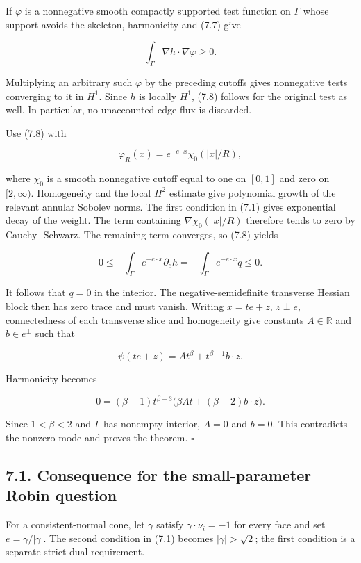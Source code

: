 \documentclass[11pt]{article}
\begin{document}
If \(\varphi\) is a nonnegative smooth compactly supported test function
on \(\overline\Gamma\) whose support avoids the skeleton, harmonicity
and (7.7) give

\[
\int_\Gamma\nabla h\cdot\nabla\varphi\ge0.
\tag{7.8}
\]

Multiplying an arbitrary such \(\varphi\) by the preceding cutoffs gives
nonnegative tests converging to it in \(H^1\). Since \(h\) is locally
\(H^1\), (7.8) follows for the original test as well. In particular, no
unaccounted edge flux is discarded.

Use (7.8) with

\[
\varphi_R(x)=e^{-e\cdot x}\chi_0(|x|/R),
\tag{7.9}
\]

where \(\chi_0\) is a smooth nonnegative cutoff equal to one on
\([0,1]\) and zero on \([2,\infty)\). Homogeneity and the local \(H^2\)
estimate give polynomial growth of the relevant annular Sobolev norms.
The first condition in (7.1) gives exponential decay of the weight. The
term containing \(\nabla\chi_0(|x|/R)\) therefore tends to zero by
Cauchy-\/-Schwarz. The remaining term converges, so (7.8) yields

\[
0\le-\int_\Gamma e^{-e\cdot x}\partial_e h
=-\int_\Gamma e^{-e\cdot x}q\le0.
\tag{7.10}
\]

It follows that \(q=0\) in the interior. The negative-semidefinite
transverse Hessian block then has zero trace and must vanish. Writing
\(x=te+z\), \(z\perp e\), connectedness of each transverse slice and
homogeneity give constants \(A\in\mathbb R\) and \(b\in e^\perp\) such
that

\[
\psi(te+z)=At^\beta+t^{\beta-1}b\cdot z.
\tag{7.11}
\]

Harmonicity becomes

\[
0=(\beta-1)t^{\beta-3}
\big(\beta At+(\beta-2)b\cdot z\big).
\tag{7.12}
\]

Since \(1<\beta<2\) and \(\Gamma\) has nonempty interior, \(A=0\) and
\(b=0\). This contradicts the nonzero mode and proves the theorem. \(\square\)

\subsection{7.1. Consequence for the small-parameter Robin
question}\label{consequence-for-the-small-parameter-robin-question}

For a consistent-normal cone, let \(\gamma\) satisfy
\(\gamma\cdot\nu_i=-1\) for every face and set \(e=\gamma/|\gamma|\).
The second condition in (7.1) becomes \(|\gamma|>\sqrt2\); the first
condition is a separate strict-dual requirement.
\end{document}
